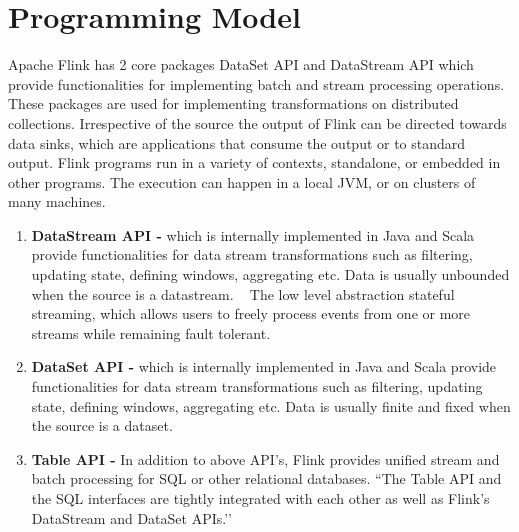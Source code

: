 \section{Programming Model}
Apache Flink has 2 core packages DataSet API and DataStream API which provide functionalities for implementing batch and stream processing operations. These packages are used for implementing  transformations on distributed collections. Irrespective of the source the output of Flink can be directed towards data sinks, which are applications that consume the output or to standard output. Flink programs run in a variety of contexts, standalone, or embedded in other programs. The execution can happen in a local JVM, or on clusters of many machines.~\cite{link8}\\
\begin{enumerate}\item \textbf{DataStream API - } which is internally implemented in Java and Scala provide functionalities for data stream transformations such as filtering, updating state, defining windows, aggregating etc. Data is usually unbounded when the source is a datastream. ~\cite{link6} The low level abstraction stateful streaming, which allows users to freely process events from one or more streams while remaining fault tolerant.~\cite{link4}
\item \textbf{DataSet API - } which is internally implemented in Java and Scala provide functionalities for data stream transformations such as filtering, updating state, defining windows, aggregating etc. Data is usually finite and fixed when the source is a dataset.~\cite{[7]}
\item \textbf{Table API - } In addition to above API’s, Flink provides unified stream and batch processing for SQL or other relational databases. ``The Table API and the SQL interfaces are tightly integrated with each other as well as Flink’s DataStream and DataSet APIs.’’~\cite{link51}\\\end{enumerate}
